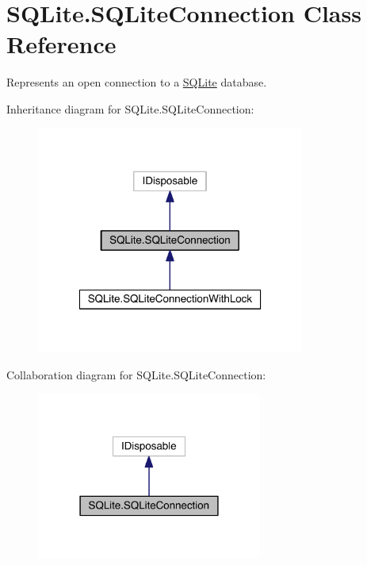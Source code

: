 \hypertarget{class_s_q_lite_1_1_s_q_lite_connection}{\section{S\+Q\+Lite.\+S\+Q\+Lite\+Connection Class Reference}
\label{class_s_q_lite_1_1_s_q_lite_connection}
}


Represents an open connection to a \hyperlink{namespace_s_q_lite}{S\+Q\+Lite} database.  




Inheritance diagram for S\+Q\+Lite.\+S\+Q\+Lite\+Connection\+:
\nopagebreak
\begin{figure}[H]
\begin{center}
\leavevmode
\includegraphics[width=250pt]{class_s_q_lite_1_1_s_q_lite_connection__inherit__graph}
\end{center}
\end{figure}


Collaboration diagram for S\+Q\+Lite.\+S\+Q\+Lite\+Connection\+:
\nopagebreak
\begin{figure}[H]
\begin{center}
\leavevmode
\includegraphics[width=210pt]{class_s_q_lite_1_1_s_q_lite_connection__coll__graph}
\end{center}
\end{figure}
